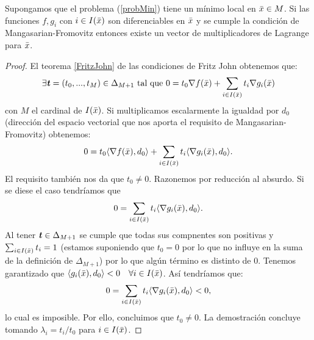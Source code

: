 		\begin{teoremaBox}
		Supongamos que el problema (\ref{probMin}) tiene un mínimo local en $ \bar{x} \in M $. Si las funciones $ f, g_i $ con $ i \in I(\bar{x}) $ son diferenciables en $ \bar{x} $ y se cumple la condición de Mangasarian-Fromovitz entonces existe un vector de multiplicadores de Lagrange para $ \bar{x} $.
		\end{teoremaBox} 
	
		\begin{proof}
		El teorema \ref{FritzJohn} de las condiciones de Fritz John obtenemos que:
		\[
		\exists \textbf{\emph{t}} = (t_0, ..., t_{M})\in \Delta_{M+1}  \text{ tal que }0 = t_0 \nabla f(\bar{x}) + \sum_{i \in I(\bar{x})}  t_i \nabla g_i (\bar{x})
		\]		
		con $ M $ el cardinal de $ I(\bar{x}) $. Si multiplicamos escalarmente la igualdad por $ d_0 $ (dirección del espacio vectorial que nos aporta el requisito de  Mangasarian-Fromovitz) obtenemos:
		\[
		0 = t_0 \langle \nabla f(\bar{x}), d_0 \rangle + \sum_{i \in I(\bar{x})}  t_i \langle \nabla g_i (\bar{x}), d_0 \rangle.
		\]
		El requisito también nos da que $ t_0 \neq 0$. Razonemos por reducción al absurdo. Si se diese el caso tendríamos que
		\[
		0 = \sum_{i \in I(\bar{x})}  t_i \langle \nabla g_i (\bar{x}), d_0 \rangle.
		\]
		Al tener $ \textbf{\emph{t}} \in \Delta_{M+1} $ se cumple que todas sus compnentes son positivas y $ \sum_{i \in I(\bar{x})}  t_i = 1 $ (estamos suponiendo que $ t_0 = 0 $ por lo que no influye en la suma de la definición de $ \Delta_{M+1} $) por lo que algún término es distinto de 0. Tenemos garantizado que $  \langle g_i (\bar{x}), d_0 \rangle < 0 \quad \forall i \in I(\bar{x}) $. Así tendríamos que:
			\[
		0 = \sum_{i \in I(\bar{x})}  t_i \langle \nabla g_i (\bar{x}), d_0 \rangle < 0,
		\]
		lo cual es imposible. Por ello, concluimos que $ t_0 \neq 0 $. La demostración concluye tomando $ \lambda_i = t_i / t_0 $ para $ i \in I(\bar{x}) $.
		\end{proof}
		